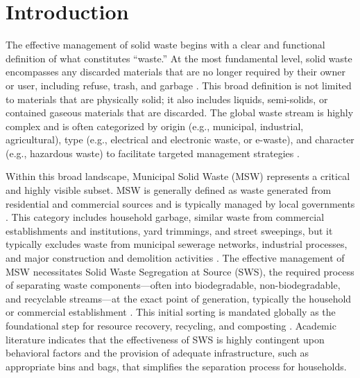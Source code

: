 \chapter{Introduction}

The effective management of solid waste begins with a clear and functional definition of what constitutes ``waste.'' At the most fundamental level, solid waste encompasses any discarded materials that are no longer required by their owner or user, including refuse, trash, and garbage \citep{UNEP2024}. This broad definition is not limited to materials that are physically solid; it also includes liquids, semi-solids, or contained gaseous materials that are discarded. The global waste stream is highly complex and is often categorized by origin (e.g., municipal, industrial, agricultural), type (e.g., electrical and electronic waste, or e-waste), and character (e.g., hazardous waste) to facilitate targeted management strategies \citep{WHO2024}.

Within this broad landscape, Municipal Solid Waste (MSW) represents a critical and highly visible subset.  MSW is generally defined as waste generated from residential and commercial sources and is typically managed by local governments \citep{Kaza2021}. This category includes household garbage, similar waste from commercial establishments and institutions, yard trimmings, and street sweepings, but it typically excludes waste from municipal sewerage networks, industrial processes, and major construction and demolition activities \citep{Kaza2021}. The effective management of MSW necessitates Solid Waste Segregation at Source (SWS), the required process of separating waste components—often into biodegradable, non-biodegradable, and recyclable streams—at the exact point of generation, typically the household or commercial establishment \citep{WorldBank2022}. This initial sorting is mandated globally as the foundational step for resource recovery, recycling, and composting \citep{WorldBank2022}. Academic literature indicates that the effectiveness of SWS is highly contingent upon behavioral factors and the provision of adequate infrastructure, such as appropriate bins and bags, that simplifies the separation process for households.

